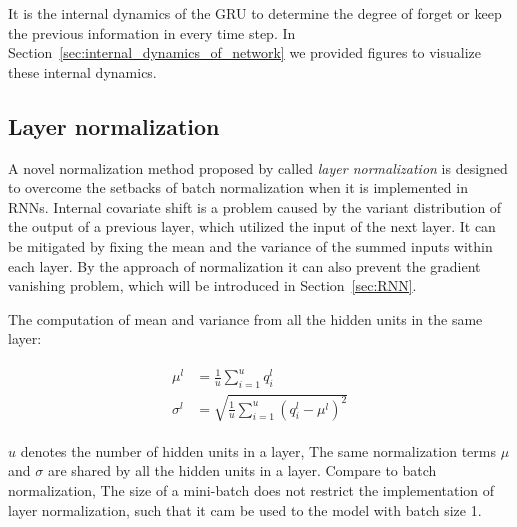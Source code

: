 \noindent It is the internal dynamics of the GRU to determine the degree of forget or keep the previous information in every time step.
In Section~\ref{sec:internal_dynamics_of_network} we provided figures to visualize these internal dynamics.

\subsection{Layer normalization}
\label{sec:layer_normalization}
    
A novel normalization method proposed by \cite{xu2019understanding} called \textit{layer normalization} is designed to overcome the setbacks of batch normalization when it is implemented in RNNs.
Internal covariate shift is a problem caused by the variant distribution of the output of a previous layer,
which utilized the input of the next layer.
It can be mitigated by fixing the mean and the variance of the summed inputs within each layer.
By the approach of normalization it can also prevent the gradient vanishing problem,
which will be introduced in Section~\ref{sec:RNN}.

The computation of mean and variance from all the hidden units in the same layer:

\begin{align}
    \begin{split}
        \label{eq:normalization_term}
        \mu^l &= \frac{1}{u} \sum^{u}_{i=1} q^l_i \\
        \sigma^l &= \sqrt{ \frac{1}{u} \sum^u_{i=1} \left( q^l_i -\mu^l  \right)^2 }
    \end{split}
\end{align}

\noindent $u$ denotes the number of hidden units in a layer, 
The same normalization terms $\mu$ and $\sigma$ are shared by all the hidden units in a layer.
Compare to batch normalization,
The size of a mini-batch does not restrict the implementation of layer normalization,
such that it cam be used to the model with batch size 1.


